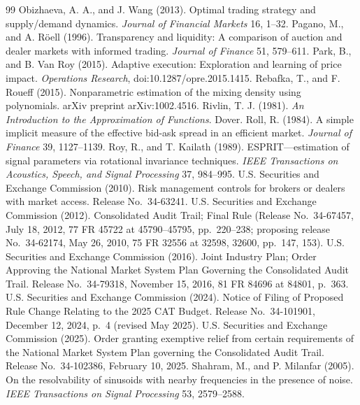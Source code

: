 \documentclass[12pt]{article}
\theoremstyle{definition}
\theoremstyle{remark}
\begin{document}
\begin{thebibliography}{99}
 Obizhaeva, A. A., and J. Wang (2013). Optimal trading strategy and supply/demand dynamics. \emph{Journal of Financial Markets} 16, 1--32.
 Pagano, M., and A. R\"oell (1996). Transparency and liquidity: A comparison of auction and dealer markets with informed trading. \emph{Journal of Finance} 51, 579--611.
 Park, B., and B. Van Roy (2015). Adaptive execution: Exploration and learning of price impact. \emph{Operations Research}, doi:10.1287/opre.2015.1415.
 Rebafka, T., and F. Roueff (2015). Nonparametric estimation of the mixing density using polynomials. arXiv preprint arXiv:1002.4516.
 Rivlin, T. J. (1981). \emph{An Introduction to the Approximation of Functions}. Dover.
 Roll, R. (1984). A simple implicit measure of the effective bid-ask spread in an efficient market. \emph{Journal of Finance} 39, 1127--1139.
 Roy, R., and T. Kailath (1989). ESPRIT---estimation of signal parameters via rotational invariance techniques. \emph{IEEE Transactions on Acoustics, Speech, and Signal Processing} 37, 984--995.
 U.S. Securities and Exchange Commission (2010). Risk management controls for brokers or dealers with market access. Release No.\ 34-63241.
 U.S. Securities and Exchange Commission (2012). Consolidated Audit Trail; Final Rule (Release No.\ 34-67457, July 18, 2012, 77 FR 45722 at 45790--45795, pp.\ 220--238; proposing release No.\ 34-62174, May 26, 2010, 75 FR 32556 at 32598, 32600, pp.\ 147, 153).
 U.S. Securities and Exchange Commission (2016). Joint Industry Plan; Order Approving the National Market System Plan Governing the Consolidated Audit Trail. Release No.\ 34-79318, November 15, 2016, 81 FR 84696 at 84801, p.\ 363.
 U.S. Securities and Exchange Commission (2024). Notice of Filing of Proposed Rule Change Relating to the 2025 CAT Budget. Release No.\ 34-101901, December 12, 2024, p.\ 4 (revised May 2025).
 U.S. Securities and Exchange Commission (2025). Order granting exemptive relief from certain requirements of the National Market System Plan governing the Consolidated Audit Trail. Release No.\ 34-102386, February 10, 2025.
 Shahram, M., and P. Milanfar (2005). On the resolvability of sinusoids with nearby frequencies in the presence of noise. \emph{IEEE Transactions on Signal Processing} 53, 2579--2588.

\end{thebibliography}
\end{document}
